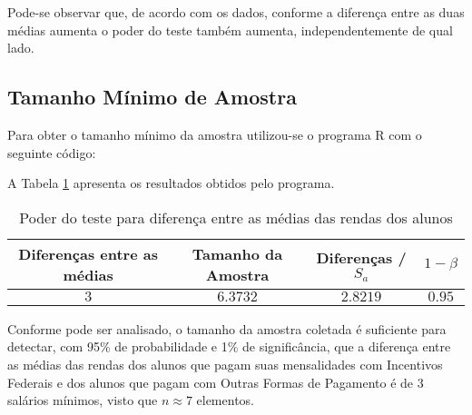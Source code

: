 Pode-se observar que, de acordo com os dados, conforme a diferença entre as duas médias aumenta o poder do teste também aumenta, independentemente de qual lado.

\subsection{Tamanho Mínimo de Amostra}

Para obter o tamanho mínimo da amostra utilizou-se o programa R com o seguinte código:


A Tabela \ref{tb:5c} apresenta os resultados obtidos pelo programa.

\begin{table}[ht]
\centering
\caption{Poder do teste para diferença entre as médias das rendas dos alunos} 
\label{tb:5c}
\begin{tabular}{cccc}
  \toprule
  Diferenças entre as médias & Tamanho da Amostra & Diferenças / $S_a$  & $1 - \beta$ \\
  \midrule
 $3$ & $6.3732$ & $2.8219$ & $0.95$ \\ 
   \bottomrule
\end{tabular}
\end{table}

Conforme pode ser analisado, o tamanho da amostra coletada é suficiente para detectar, com 95\% de probabilidade e 1\% de significância, que a diferença entre as médias das rendas dos alunos que 
pagam suas mensalidades com Incentivos Federais e dos alunos que pagam com Outras Formas de Pagamento é de 3 salários mínimos, visto que $n \approx 7$ elementos.

